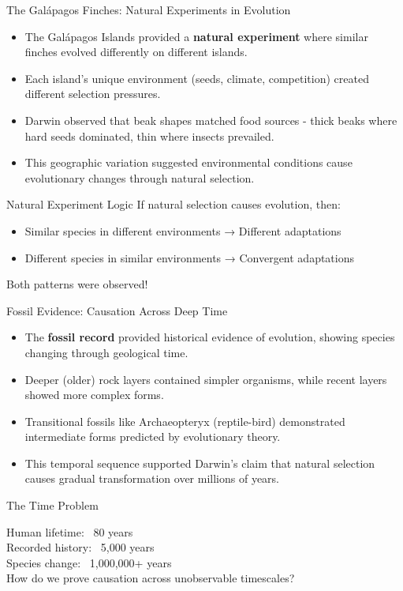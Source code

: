 \documentclass{beamer}
\begin{document}
	\begin{frame}{The Galápagos Finches: Natural Experiments in Evolution}
		\begin{itemize}
			\item The Galápagos Islands provided a \textbf{natural experiment} where similar finches evolved differently on different islands.
			\item Each island's unique environment (seeds, climate, competition) created different selection pressures.
			\item Darwin observed that beak shapes matched food sources - thick beaks where hard seeds dominated, thin where insects prevailed.
			\item This geographic variation suggested environmental conditions cause evolutionary changes through natural selection.
		\end{itemize}
		
		\begin{alertblock}{Natural Experiment Logic}
			If natural selection causes evolution, then:
			\begin{itemize}
				\item Similar species in different environments → Different adaptations
				\item Different species in similar environments → Convergent adaptations
			\end{itemize}
			Both patterns were observed!
		\end{alertblock}
	\end{frame}
	
	\begin{frame}{Fossil Evidence: Causation Across Deep Time}
		\begin{itemize}
			\item The \textbf{fossil record} provided historical evidence of evolution, showing species changing through geological time.
			\item Deeper (older) rock layers contained simpler organisms, while recent layers showed more complex forms.
			\item Transitional fossils like Archaeopteryx (reptile-bird) demonstrated intermediate forms predicted by evolutionary theory.
			\item This temporal sequence supported Darwin's claim that natural selection causes gradual transformation over millions of years.
		\end{itemize}
		
		\begin{block}{The Time Problem}
			\begin{center}
				Human lifetime: ~80 years\\
				Recorded history: ~5,000 years\\
				Species change: ~1,000,000+ years\\
				\vspace{0.2cm}
				How do we prove causation across unobservable timescales?
			\end{center}
		\end{block}
	\end{frame}
	
\end{document}
